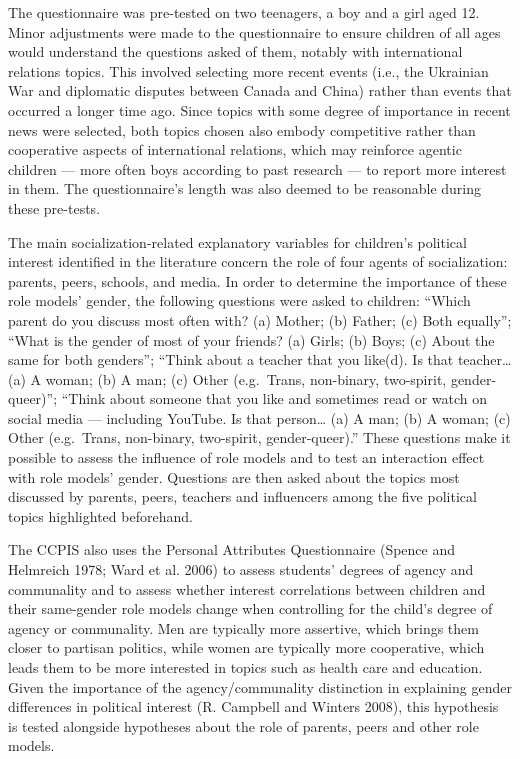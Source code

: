 \documentclass[
  letterpaper,
  DIV=11,
  numbers=noendperiod]{scrreprt}
\begin{document}
The questionnaire was pre-tested on two teenagers, a boy and a girl aged
12. Minor adjustments were made to the questionnaire to ensure children
of all ages would understand the questions asked of them, notably with
international relations topics. This involved selecting more recent
events (i.e., the Ukrainian War and diplomatic disputes between Canada
and China) rather than events that occurred a longer time ago. Since
topics with some degree of importance in recent news were selected, both
topics chosen also embody competitive rather than cooperative aspects of
international relations, which may reinforce agentic children --- more
often boys according to past research --- to report more interest in
them. The questionnaire's length was also deemed to be reasonable during
these pre-tests.

The main socialization-related explanatory variables for children's
political interest identified in the literature concern the role of four
agents of socialization: parents, peers, schools, and media. In order to
determine the importance of these role models' gender, the following
questions were asked to children: ``Which parent do you discuss most
often with? (a) Mother; (b) Father; (c) Both equally''; ``What is the
gender of most of your friends? (a) Girls; (b) Boys; (c) About the same
for both genders''; ``Think about a teacher that you like(d). Is that
teacher\ldots{} (a) A woman; (b) A man; (c) Other (e.g.~Trans,
non-binary, two-spirit, gender-queer)''; ``Think about someone that you
like and sometimes read or watch on social media --- including YouTube.
Is that person\ldots{} (a) A man; (b) A woman; (c) Other (e.g.~Trans,
non-binary, two-spirit, gender-queer).'' These questions make it
possible to assess the influence of role models and to test an
interaction effect with role models' gender. Questions are then asked
about the topics most discussed by parents, peers, teachers and
influencers among the five political topics highlighted beforehand.

The CCPIS also uses the Personal Attributes Questionnaire (Spence and
Helmreich 1978; Ward et al. 2006) to assess students' degrees of agency
and communality and to assess whether interest correlations between
children and their same-gender role models change when controlling for
the child's degree of agency or communality. Men are typically more
assertive, which brings them closer to partisan politics, while women
are typically more cooperative, which leads them to be more interested
in topics such as health care and education. Given the importance of the
agency/communality distinction in explaining gender differences in
political interest (R. Campbell and Winters 2008), this hypothesis is
tested alongside hypotheses about the role of parents, peers and other
role models.
\end{document}
